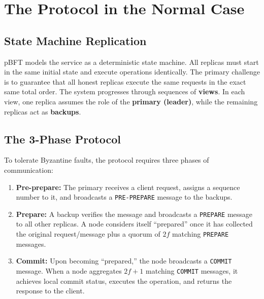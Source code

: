 \section{The Protocol in the Normal Case}

\subsection{State Machine Replication}
pBFT models the service as a deterministic state machine. All replicas must start in the same initial state and execute operations identically. The primary challenge is to guarantee that all honest replicas execute the same requests in the exact same total order. The system progresses through sequences of \textbf{views}. In each view, one replica assumes the role of the \textbf{primary (leader)}, while the remaining replicas act as \textbf{backups}.

\subsection{The 3-Phase Protocol}
To tolerate Byzantine faults, the protocol requires three phases of communication:

\begin{enumerate}
    \item \textbf{Pre-prepare:} The primary receives a client request, assigns a sequence number to it, and broadcasts a \texttt{PRE-PREPARE} message to the backups.
    \item \textbf{Prepare:} A backup verifies the message and broadcasts a \texttt{PREPARE} message to all other replicas. A node considers itself ``prepared'' once it has collected the original request/message plus a quorum of $2f$ matching \texttt{PREPARE} messages.
    \item \textbf{Commit:} Upon becoming ``prepared,'' the node broadcasts a \texttt{COMMIT} message. When a node aggregates $2f+1$ matching \texttt{COMMIT} messages, it achieves local commit status, executes the operation, and returns the response to the client.
\end{enumerate}

